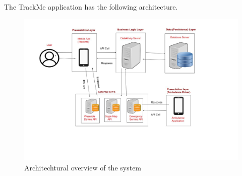 \qquad The TrackMe application has the following architecture. 
\begin{figure}[H]
	\begin{center}
		\includegraphics[width=\textwidth]{./DD_Diagrams/ArchitechuralView.jpg}
      	\caption{Architechtural overview of the system}
        \label{TrackMe_arc}
	\end{center}
\end{figure}
 